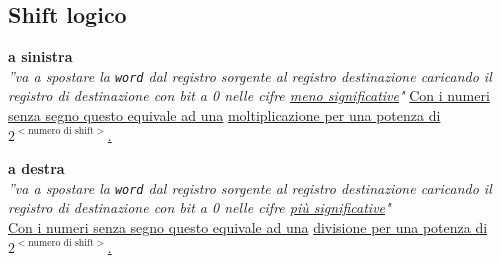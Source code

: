 \documentclass[../main.tex]{subfiles}
\begin{document}
\subsection{Shift logico}
\vspace*{-4mm}
\begin{table}[h!]
    \begin{minipage}{.02\linewidth}
        \hspace*{0cm}
    \end{minipage}
    \begin{minipage}{.45\linewidth}
        \textbf{a sinistra} \\
        \textit{''va a spostare la \texttt{word} dal registro sorgente al registro
        destinazione caricando il registro di destinazione
        con bit a 0 nelle cifre \underline{meno significative}"}
        \underline{Con i numeri senza segno questo equivale ad una}
        \underline{moltiplicazione per una potenza di
        $2^{{<\text{numero di shift}>}}$.}

        \vspace*{3mm}

        \centering

    \end{minipage}
    \begin{minipage}{.08\linewidth}
        \hspace*{0cm}
    \end{minipage}
    \begin{minipage}{.45\linewidth}
        \textbf{a destra} \\
        \textit{''va a spostare la \texttt{word} dal registro sorgente al registro
        destinazione caricando il registro di destinazione
        con bit a 0 nelle cifre \underline{più significative}"} \\
        \underline{Con i numeri senza segno questo equivale ad una}
        \underline{divisione per una potenza di
        $2^{{<\text{numero di shift}>}}$.}


\end{minipage}
\end{table}
\end{document}
